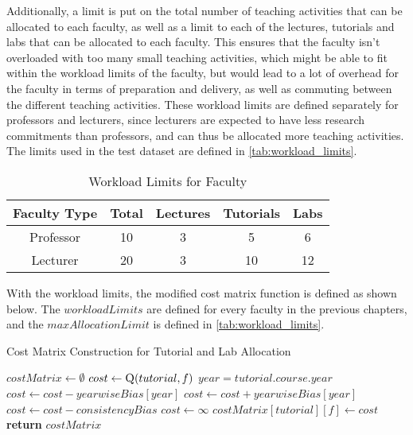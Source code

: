 Additionally, a limit is put on the total number of teaching activities that can be allocated to each faculty, as well as a limit to each of the lectures, tutorials and labs that can be allocated to each faculty. This ensures that the faculty isn't overloaded with too many small teaching activities, which might be able to fit within the workload limits of the faculty, but would lead to a lot of overhead for the faculty in terms of preparation and delivery, as well as commuting between the different teaching activities. These workload limits are defined separately for professors and lecturers, since lecturers are expected to have less research commitments than professors, and can thus be allocated more teaching activities. The limits used in the test dataset are defined in \autoref{tab:workload_limits}.

\begin{table}[H]
  \centering
  \begin{tabular}{|c|c|c|c|c|}
    \hline
    Faculty Type & Total & Lectures & Tutorials & Labs \\ \hline
    Professor    & 10    & 3        & 5         & 6    \\ \hline
    Lecturer     & 20    & 3        & 10        & 12   \\ \hline
  \end{tabular}
  \caption{Workload Limits for Faculty}
  \label{tab:workload_limits}
\end{table}

With the workload limits, the modified cost matrix function is defined as shown below. The $workloadLimits$ are defined for every faculty in the previous chapters, and the $maxAllocationLimit$ is defined in \autoref{tab:workload_limits}.

\begin{algorithm}[H]
  \caption{Cost Matrix Construction for Tutorial and Lab Allocation}
  \begin{algorithmic}
    \State $costMatrix \gets \emptyset$
    \State $cost \gets \Call{Q}{tutorial, f}$
    \State $year = tutorial.course.year$
    \State $cost \gets cost - yearwiseBias[year]$
    \Else
    \State $cost \gets cost + yearwiseBias[year]$
    \EndIf
    \State $cost \gets cost - consistencyBias$
    \EndIf
    \State $cost \gets \infty$
    \EndIf
    \State $costMatrix[tutorial][f] \gets cost$
    \EndFor
    \EndFor
    \State \textbf{return} $costMatrix$
    \EndProcedure
  \end{algorithmic}
  \label{alg:tutorial_cost_matrix_construction}
\end{algorithm}

